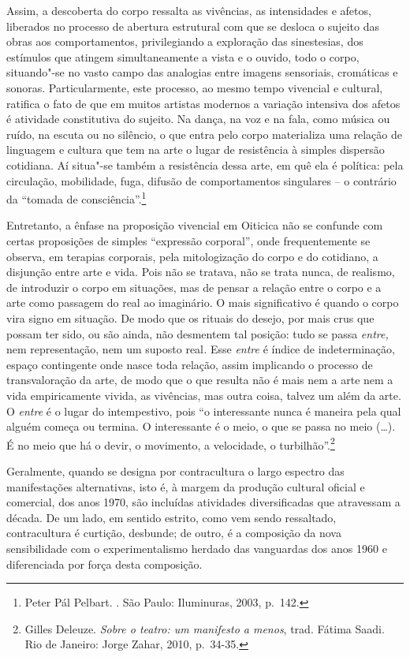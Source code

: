 Assim, a descoberta do corpo ressalta as vivências, as intensidades e
afetos, liberados no processo de abertura estrutural com que se desloca
o sujeito das obras aos comportamentos, privilegiando a exploração das
sinestesias, dos estímulos que atingem simultaneamente a vista e o
ouvido, todo o corpo, situando"-se no vasto campo das analogias entre
imagens sensoriais, cromáticas e sonoras. Particularmente, este
processo, ao mesmo tempo vivencial e cultural, ratifica o fato de que em
muitos artistas modernos a variação intensiva dos afetos é atividade
constitutiva do sujeito. Na dança, na voz e na fala, como música ou
ruído, na escuta ou no silêncio, o que entra pelo corpo materializa uma
relação de linguagem e cultura que tem na arte o lugar de resistência à
simples dispersão cotidiana. Aí situa"-se também a resistência dessa
arte, em quê ela é política: pela circulação, mobilidade, fuga, difusão
de comportamentos singulares -- o contrário da ``tomada de
consciência''.\footnote{Peter Pál Pelbart. {}. São Paulo: Iluminuras, 2003, p.~142.}

Entretanto, a ênfase na proposição vivencial em Oiticica não se
confunde com certas proposições de simples ``expressão corporal'', onde
frequentemente se observa, em terapias corporais, pela mitologização do
corpo e do cotidiano, a disjunção entre arte e vida. Pois não se
tratava, não se trata nunca, de realismo, de introduzir o corpo em
situações, mas de pensar a relação entre o corpo e a arte como passagem
do real ao imaginário. O mais significativo é quando o corpo vira signo
em situação. De modo que os rituais do desejo, por mais crus que possam
ter sido, ou são ainda, não desmentem tal posição: tudo se passa
\emph{entre,} nem representação, nem um suposto real\emph{.} Esse
\emph{entre} é índice de indeterminação, espaço contingente onde nasce
toda relação, assim implicando o processo de transvaloração da arte, de
modo que o que resulta não é mais nem a arte nem a vida empiricamente
vivida, as vivências, mas outra coisa, talvez um além da arte. O
\emph{entre} é o lugar do intempestivo, pois ``o interessante nunca é
maneira pela qual alguém começa ou termina. O interessante é o meio, o
que se passa no meio (\ldots{}). É no meio que há o devir, o movimento, a
velocidade, o turbilhão''.\footnote{Gilles Deleuze. \emph{Sobre o
  teatro: um manifesto a menos}, trad. Fátima Saadi. Rio de Janeiro:
  Jorge Zahar, 2010, p.~34-35.}

\asterisc

Geralmente, quando se designa por contracultura o largo espectro das
manifestações alternativas, isto é, à margem da produção cultural
oficial e comercial, dos anos 1970, são incluídas atividades
diversificadas que atravessam a década. De um lado, em sentido estrito,
como vem sendo ressaltado, contracultura é curtição, desbunde; de outro,
é a composição da nova sensibilidade com o experimentalismo herdado das
vanguardas dos anos 1960 e diferenciada por força desta composição.

